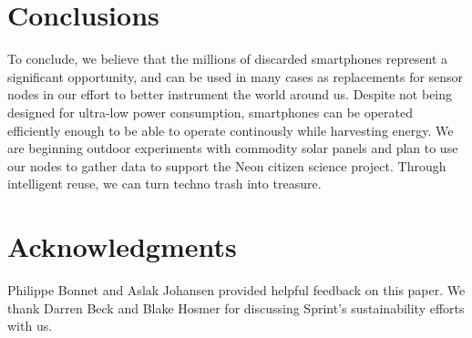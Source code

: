 \section{Conclusions}
\label{sec-conclusion}

To conclude, we believe that the millions of discarded smartphones represent
a significant opportunity, and can be used in many cases as replacements for
sensor nodes in our effort to better instrument the world around us. Despite
not being designed for ultra-low power consumption, smartphones can be
operated efficiently enough to be able to operate continously while
harvesting energy. We are beginning outdoor experiments with commodity solar
panels and plan to use our nodes to gather data to support the Neon citizen
science project. Through intelligent reuse, we can turn techno trash into
treasure.

\section*{Acknowledgments}

Philippe Bonnet and Aslak Johansen provided helpful feedback on this paper.
We thank Darren Beck and Blake Hosmer for discussing Sprint's sustainability
efforts with us.
